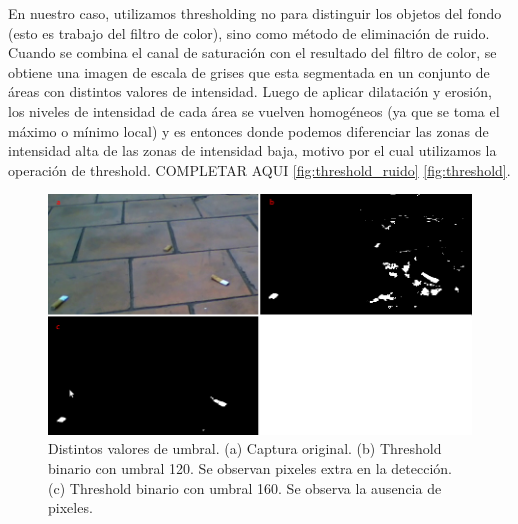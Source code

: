 \indent En nuestro caso, utilizamos thresholding no para distinguir los objetos del fondo (esto es trabajo del filtro de color), sino como método de eliminación de ruido. Cuando se combina el canal de saturación con el resultado del filtro de color, se obtiene una imagen de escala de grises que esta segmentada en un conjunto de áreas con distintos valores de intensidad. Luego de aplicar dilatación y erosión, los niveles de intensidad de cada área se vuelven homogéneos (ya que se toma el máximo o mínimo local) y es entonces donde podemos diferenciar las zonas de intensidad alta de las zonas de intensidad baja, motivo por el cual utilizamos la operación de threshold. COMPLETAR AQUI \ref{fig:threshold_ruido} \ref{fig:threshold}. 
\begin{figure}[tpb]
\begin{center}
  \includegraphics[scale=0.4]{figuras/threshold-dif.png}
\end{center}
  \caption{\small Distintos valores de umbral. (a) Captura original. 
  (b) Threshold binario con umbral 120. Se observan pixeles extra en 
  la detección. (c) Threshold binario con umbral 160. Se observa la 
  ausencia de pixeles. }
  \label{fig:thresh-dif}
\end{figure}


